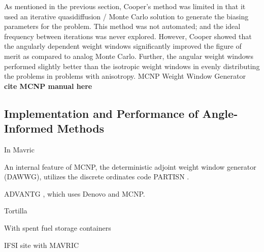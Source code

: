 As mentioned in the previous section, Cooper's method was limited in that it used an
iterative quasidiffusion / Monte Carlo solution to generate the biasing parameters for
the problem. This method was not automated; and the ideal frequency between iterations
was never explored. However, Cooper showed that the angularly dependent weight windows
significantly improved the figure of merit as compared to analog Monte Carlo.
Further, the
angular weight windows performed slightly better than the isotropic weight windows in
evenly distributing the problems in problems with anisotropy.
MCNP Weight Window Generator \textbf{cite MCNP manual here}



\subsection{Implementation and Performance of Angle-Informed Methods}
\label{sec:resultsangle}

In Mavric \cite{peplow_advanced_2007}

An internal feature of MCNP, the deterministic adjoint weight window generator
(DAWWG), utilizes the discrete ordinates code PARTISN
\cite{sweezy_automated_2005}.

ADVANTG \cite{mosher_new_2010, wagner_review_2011, bevill_new_2012}, which uses
Denovo \cite{evans_denovo:_2010-1} and MCNP.

Tortilla \cite{somasundaram_implementation_2013}

With spent fuel storage containers \cite{chen_surface_2011}

IFSI site with MAVRIC \cite{sheu_dose_2011}


